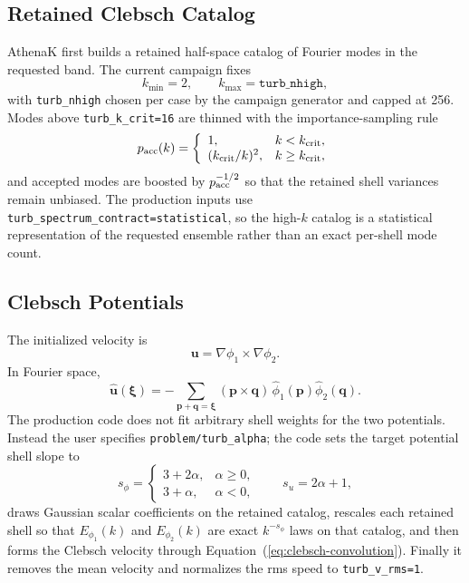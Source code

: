 \documentclass[11pt]{article}
\newcommand{\uu}{\mathbf{u}}
\newcommand{\pp}{\mathbf{p}}
\newcommand{\qq}{\mathbf{q}}
\newcommand{\xii}{\boldsymbol{\xi}}
\newcommand{\code}[1]{\texttt{#1}}
\begin{document}
\subsection{Retained Clebsch Catalog}
AthenaK first builds a retained half-space catalog of Fourier modes in the
requested band. The current campaign fixes
\begin{equation}
k_{\min}=2,\qquad k_{\max}=\code{turb\_nhigh},
\end{equation}
with \code{turb\_nhigh} chosen per case by the campaign generator and capped at
256. Modes above \code{turb\_k\_crit=16} are thinned with the importance-sampling
rule
\begin{equation}
p_{\rm acc}(k)=
\left\{
\begin{array}{ll}
1, & k<k_{\rm crit}, \\
(k_{\rm crit}/k)^2, & k\ge k_{\rm crit},
\end{array}
\right.
\end{equation}
and accepted modes are boosted by $p_{\rm acc}^{-1/2}$ so that the retained
shell variances remain unbiased. The production inputs use
\code{turb\_spectrum\_contract=statistical}, so the high-$k$ catalog is a
statistical representation of the requested ensemble rather than an exact
per-shell mode count.

\subsection{Clebsch Potentials}
The initialized velocity is
\begin{equation}
\uu = \nabla\phi_1\times\nabla\phi_2.
\label{eq:clebsch}
\end{equation}
In Fourier space,
\begin{equation}
\hat{\uu}(\xii) =
-\sum_{\pp+\qq=\xii}
(\pp\times\qq)\,\hat{\phi}_1(\pp)\hat{\phi}_2(\qq).
\label{eq:clebsch-convolution}
\end{equation}
The production code does not fit arbitrary shell weights for the two potentials.
Instead the user specifies \code{problem/turb\_alpha}; the code sets the target
potential shell slope to
\begin{equation}
s_\phi =
\begin{cases}
3 + 2\alpha, & \alpha \ge 0,\\
3 + \alpha, & \alpha < 0,
\end{cases}
\qquad
s_u = 2\alpha + 1,
\end{equation}
draws Gaussian scalar coefficients on the retained catalog, rescales each
retained shell so that $E_{\phi_1}(k)$ and $E_{\phi_2}(k)$ are exact
$k^{-s_\phi}$ laws on that catalog, and then forms the Clebsch velocity through
Equation~(\ref{eq:clebsch-convolution}). Finally it removes the mean velocity
and normalizes the rms speed to \code{turb\_v\_rms=1}.
\end{document}
